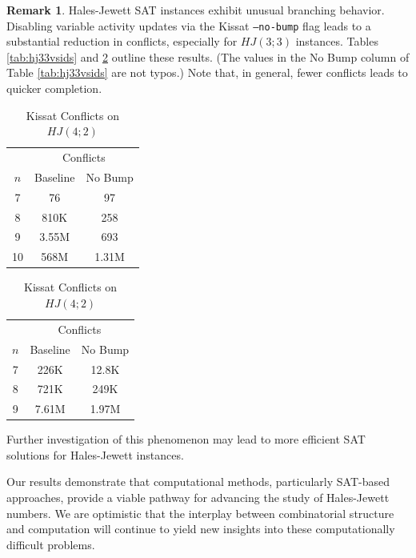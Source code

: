 \documentclass[11pt]{article}
\theoremstyle{definition}
\newtheorem{rem}[thm]{Remark}
\begin{document}
\begin{rem}
Hales-Jewett SAT instances exhibit unusual branching behavior. Disabling variable activity updates via the Kissat \texttt{--no-bump} flag leads to a substantial reduction in conflicts, especially for  $HJ(3;3)$ instances. Tables \ref{tab:hj33vsids} and \ref{tab:hj42vsids} outline these results.
(The values in the No Bump column of Table \ref{tab:hj33vsids} are not typos.)
Note that, in general, fewer conflicts leads to quicker completion.

\begin{table}[H]
\centering

\begin{minipage}[b]{0.48\textwidth}
\centering
\begin{tabular}{c|cc}
\toprule
 & \multicolumn{2}{c}{Conflicts} \\
$n$ & Baseline & No Bump \\
\midrule
7  & 76     & 97 \\
8  & 810K   & 258 \\
9  & 3.55M  & 693 \\
10 & 568M   & 1.31M \\
\bottomrule
\end{tabular}\caption{Kissat Conflicts on $HJ(3;3)$}\label{tab:hj33vsids}
\end{minipage}
\hfill
\begin{minipage}[b]{0.48\textwidth}
\centering
\begin{tabular}{c|cc}
\toprule
 & \multicolumn{2}{c}{Conflicts} \\
$n$ & Baseline & No Bump \\
\midrule
7  & 226K  & 12.8K \\
8  & 721K  & 249K \\
9  & 7.61M & 1.97M \\
\bottomrule
\end{tabular}\caption{Kissat Conflicts on $HJ(4;2)$}\label{tab:hj42vsids}
\end{minipage}

\end{table}


Further investigation of this phenomenon may lead to more efficient SAT solutions for Hales-Jewett instances.

Our results demonstrate that computational methods, particularly SAT-based approaches, provide a viable pathway for advancing the study of Hales-Jewett numbers. We are optimistic that the interplay between combinatorial structure and computation will continue to yield new insights into these computationally difficult problems.

\end{rem}
\end{document}
